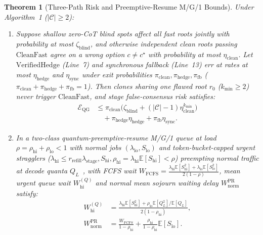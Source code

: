 \documentclass[conference]{IEEEtran}
\newtheorem{theorem}{Theorem}
\theoremstyle{definition}
\theoremstyle{remark}
\newcommand{\E}{\mathbb{E}}
\begin{document}
\begin{theorem}[Three-Path Risk and Preemptive-Resume M/G/1 Bounds]\label{thm:optimality}
Under Algorithm~1 ($|\mathcal{C}| \ge 2$):
\begin{enumerate}
  \item Suppose shallow zero-CoT blind spots affect all fast roots jointly with probability at most $\zeta_{\mathrm{blind}}$, and otherwise independent clean roots passing $\mathrm{CleanFast}$ agree on a wrong option $c \neq c^\star$ with probability at most $\eta_{\mathrm{clean}}$. Let $\mathrm{VerifiedHedge}$ (Line~7) and synchronous fallback (Line~13) err at rates at most $\eta_{\mathrm{hedge}}$ and $\eta_{\mathrm{sync}}$ under exit probabilities $\pi_{\mathrm{clean}}, \pi_{\mathrm{hedge}}, \pi_{\mathrm{fb}}$ ($\pi_{\mathrm{clean}} + \pi_{\mathrm{hedge}} + \pi_{\mathrm{fb}} = 1$). Then clones sharing one flawed root $r_0$ ($k_{\min} \ge 2$) never trigger $\mathrm{CleanFast}$, and stage false-consensus risk satisfies:
  \begin{align}
    \mathcal{E}_{\mathrm{QG}} &\le \pi_{\mathrm{clean}}\!\big(\zeta_{\mathrm{blind}} + (|\mathcal{C}| - 1)\eta_{\mathrm{clean}}^{k_{\min}}\big) \nonumber \\
    &\quad + \pi_{\mathrm{hedge}}\eta_{\mathrm{hedge}} + \pi_{\mathrm{fb}}\eta_{\mathrm{sync}}. \label{eq:thm3_risk}
  \end{align}
  \item In a two-class quantum-preemptive-resume M/G/1 queue at load $\rho = \rho_{\mathrm{hi}} + \rho_{\mathrm{lo}} < 1$ with normal jobs $(\lambda_{\mathrm{lo}}, S_{\mathrm{lo}})$ and token-bucket-capped urgent stragglers ($\lambda_{\mathrm{hi}} \le r_{\mathrm{refill}}\lambda_{\mathrm{stage}}, S_{\mathrm{hi}}, \rho_{\mathrm{hi}} = \lambda_{\mathrm{hi}}\E[S_{\mathrm{hi}}] < \rho$) preempting normal traffic at decode quanta $Q_L$~\cite{harcholbalter2013perf}, with FCFS wait $W_{\mathrm{FCFS}} = \frac{\lambda_{\mathrm{hi}}\E[S_{\mathrm{hi}}^2] + \lambda_{\mathrm{lo}}\E[S_{\mathrm{lo}}^2]}{2(1 - \rho)}$, mean urgent queue wait $W_{\mathrm{hi}}^{(Q)}$ and normal mean sojourn waiting delay $W_{\mathrm{norm}}^{\mathrm{PR}}$ satisfy:
  \begin{align}
    W_{\mathrm{hi}}^{(Q)} &= \frac{\lambda_{\mathrm{hi}}\E[S_{\mathrm{hi}}^2] + \rho_{\mathrm{lo}}\E[Q_L^2]/\E[Q_L]}{2(1 - \rho_{\mathrm{hi}})}, \label{eq:thm3_whi} \\
    W_{\mathrm{norm}}^{\mathrm{PR}} &= \frac{W_{\mathrm{FCFS}}}{1 - \rho_{\mathrm{hi}}} + \frac{\rho_{\mathrm{hi}}}{1 - \rho_{\mathrm{hi}}}\E[S_{\mathrm{lo}}]. \label{eq:thm3_wnorm}
  \end{align}
\end{enumerate}
\end{theorem}
\end{document}
